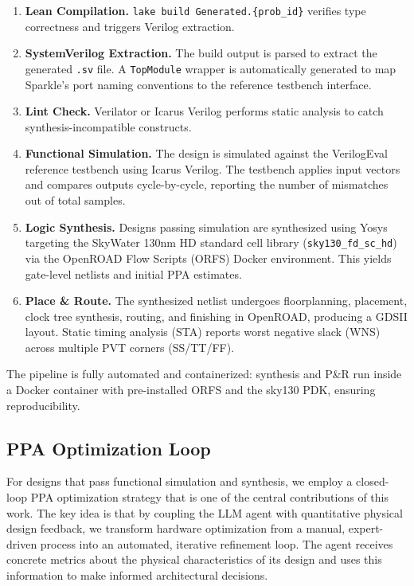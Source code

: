 \begin{enumerate}[leftmargin=*,itemsep=1pt,topsep=2pt]
    \item \textbf{Lean Compilation.} \texttt{lake build Generated.\{prob\_id\}} verifies type correctness and triggers Verilog extraction.
    \item \textbf{SystemVerilog Extraction.} The build output is parsed to extract the generated \texttt{.sv} file. A \texttt{TopModule} wrapper is automatically generated to map Sparkle's port naming conventions to the reference testbench interface.
    \item \textbf{Lint Check.} Verilator or Icarus Verilog performs static analysis to catch synthesis-incompatible constructs.
    \item \textbf{Functional Simulation.} The design is simulated against the VerilogEval reference testbench using Icarus Verilog. The testbench applies input vectors and compares outputs cycle-by-cycle, reporting the number of mismatches out of total samples.
    \item \textbf{Logic Synthesis.} Designs passing simulation are synthesized using Yosys targeting the SkyWater 130nm HD standard cell library (\texttt{sky130\_fd\_sc\_hd}) via the OpenROAD Flow Scripts (ORFS) Docker environment. This yields gate-level netlists and initial PPA estimates.
    \item \textbf{Place \& Route.} The synthesized netlist undergoes floorplanning, placement, clock tree synthesis, routing, and finishing in OpenROAD, producing a GDSII layout. Static timing analysis (STA) reports worst negative slack (WNS) across multiple PVT corners (SS/TT/FF).
\end{enumerate}

The pipeline is fully automated and containerized: synthesis and P\&R run inside a Docker container with pre-installed ORFS and the sky130 PDK, ensuring reproducibility.

\subsection{PPA Optimization Loop}
\label{sec:ppa_opt}

For designs that pass functional simulation and synthesis, we employ a closed-loop PPA optimization strategy that is one of the central contributions of this work. The key idea is that by coupling the LLM agent with quantitative physical design feedback, we transform hardware optimization from a manual, expert-driven process into an automated, iterative refinement loop. The agent receives concrete metrics about the physical characteristics of its design and uses this information to make informed architectural decisions.

